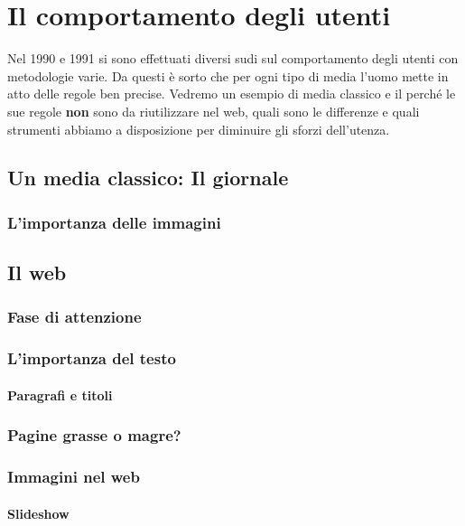 
\section{Il comportamento degli utenti}
	Nel 1990 e 1991 si sono effettuati diversi sudi sul comportamento degli utenti con metodologie varie. Da questi è sorto che per ogni tipo di media l'uomo mette in atto delle regole ben precise. 
	Vedremo un esempio di media classico e il perché le sue regole \textbf{non} sono da riutilizzare nel web, quali sono le differenze e quali strumenti abbiamo a disposizione per diminuire gli sforzi dell'utenza.
	
	\subsection{Un media classico: Il giornale}
		
		\subsubsection{L'importanza delle immagini}
		
	\subsection{Il web}
		
		\subsubsection{Fase di attenzione}
		
		\subsubsection{L'importanza del testo}
		
			\paragraph{Paragrafi e titoli}
			
		\subsubsection{Pagine grasse o magre?}
		
		\subsubsection{Immagini nel web}
			
			\paragraph{Slideshow}
			
